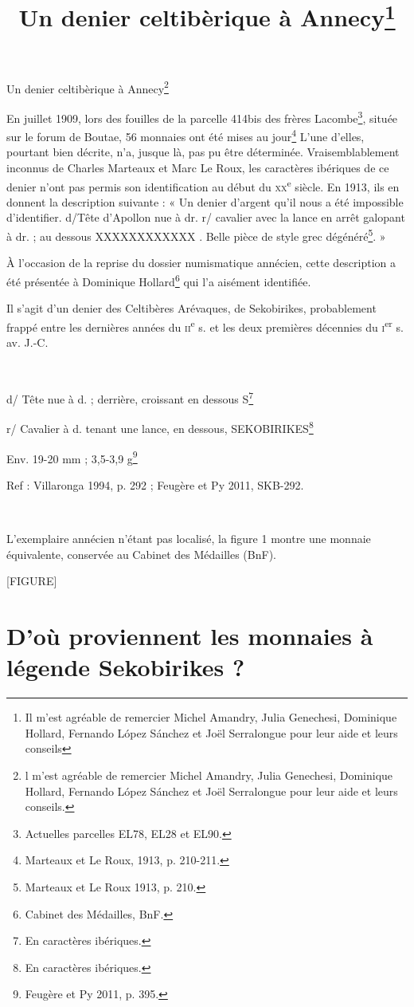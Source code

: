 \documentclass{article}
\title{Un denier celtibèrique à Annecy\footnote{Il m’est agréable de remercier Michel Amandry, Julia Genechesi, Dominique Hollard, Fernando López Sánchez et Joël Serralongue pour leur aide et leurs conseils}}
\date{}
\begin{document}
\maketitle


Un denier celtibèrique à Annecy\footnote{l m’est agréable de remercier Michel Amandry, Julia Genechesi,
 Dominique Hollard, Fernando López Sánchez et Joël
  Serralongue pour leur aide et leurs conseils.}


En juillet 1909, lors des fouilles de la parcelle 414bis des frères 
Lacombe\footnote{Actuelles parcelles EL78, EL28 et EL90.}, située sur le forum de
 Boutae, 56 monnaies ont été mises au jour\footnote{Marteaux et Le Roux, 1913, p. 210-211.}
L’une d’elles, pourtant bien décrite, n’a, jusque là, pas pu être déterminée. 
Vraisemblablement inconnus de Charles Marteaux et Marc Le Roux, les caractères ibériques
 de ce denier n’ont pas permis son identification au début du \textsc{xx}\textsuperscript{e} siècle.
 En 1913, ils en donnent la description suivante : « Un denier
 d’argent qu’il nous a été impossible d’identifier. d/Tête d’Apollon nue à dr.
 r/ cavalier avec la lance en arrêt galopant à dr. ; au dessous XXXXXXXXXXXX . Belle
 pièce de style grec dégénéré\footnote{Marteaux et Le Roux 1913, p. 210.}. »

À l’occasion de la reprise du dossier numismatique annécien, cette description
 a été présentée à Dominique Hollard\footnote{Cabinet des Médailles, BnF.} qui l’a aisément identifiée.

Il s’agit d’un denier des Celtibères Arévaques, de Sekobirikes, probablement frappé entre les dernières années du
\textsc{ii}\textsuperscript{e} s. et les deux premières décennies du \textsc{i}\textsuperscript{er} s. av. J.-C.

~

d/ Tête nue à d. ; derrière, croissant en dessous S\footnote{En caractères ibériques.}

r/ Cavalier à d. tenant une lance, en dessous, SEKOBIRIKES\footnote{En caractères ibériques.}

Env. 19-20 mm ; 3,5-3,9 g\footnote{Feugère et Py 2011, p. 395.}

Ref : Villaronga 1994, p. 292 ; Feugère et Py 2011, SKB-292.

~

L’exemplaire annécien n’étant pas localisé, la figure 1 montre une monnaie
équivalente, conservée au Cabinet des Médailles (BnF).

[FIGURE]

\section{D’où proviennent les monnaies à légende Sekobirikes ?}
\end{document}
